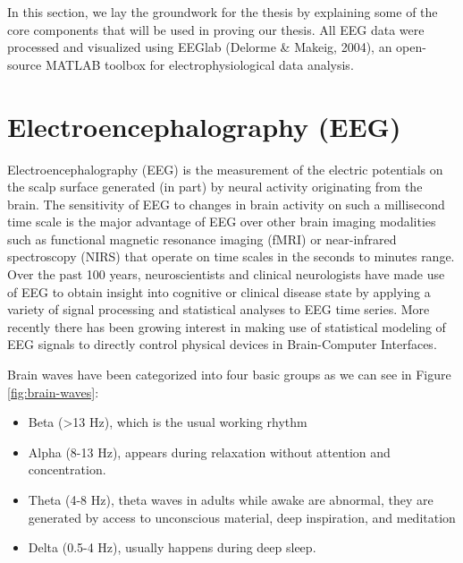 \documentclass[12pt,a4paper,titlepage,openany]{report}
\begin{document}
In this section, we lay the groundwork for the thesis by explaining some of the core components that will be used in proving our thesis.
All EEG data were processed and visualized using EEGlab (Delorme \& Makeig, 2004), an open-source MATLAB toolbox for electrophysiological data analysis.

\section{Electroencephalography (EEG)}

Electroencephalography (EEG) \cite{wikipediaEEG} is the measurement of the electric potentials on the scalp surface generated (in part) by neural activity originating from the brain. 
The sensitivity of EEG to changes in brain activity on such a millisecond time scale is the major advantage of EEG over other brain imaging modalities such as functional magnetic resonance imaging (fMRI) or near-infrared spectroscopy (NIRS) that operate on time scales in the seconds to minutes range. 
Over the past 100 years, neuroscientists and clinical neurologists have made use of EEG to obtain insight into cognitive or clinical disease state by applying a variety of signal processing and statistical analyses to EEG time series. 
More recently there has been growing interest in making use of statistical modeling of EEG signals to directly control physical devices in Brain-Computer Interfaces\cite{nunez2016}.

Brain waves have been categorized into four basic groups \cite{teplan2002} as we can see in Figure \ref{fig:brain-waves}: 
\begin{itemize}
    \item Beta (\textgreater13 Hz), which is the usual working rhythm
    \item Alpha (8-13 Hz), appears during relaxation without attention and concentration.
    \item Theta (4-8 Hz), theta waves in adults while awake are abnormal, they are generated by access to unconscious material, deep inspiration, and meditation 
    \item Delta (0.5-4 Hz), usually happens during deep sleep\cite{khalifa2012}.
\end{itemize}
\end{document}
